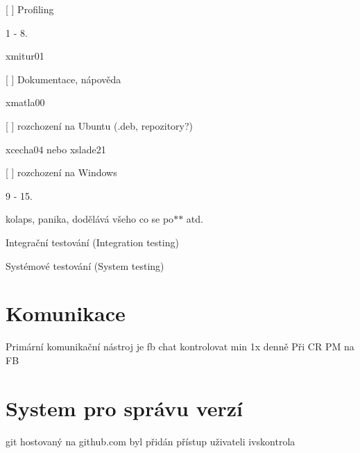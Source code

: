 \begin{DoxyItemize}
\begin{DoxyItemize}
\begin{DoxyItemize}
\item \mbox{[} \mbox{]} Profiling
\end{DoxyItemize}
\end{DoxyItemize}
\item 1 -\/ 8.
\begin{DoxyItemize}
\item xmitur01
\begin{DoxyItemize}
\item \mbox{[} \mbox{]} Dokumentace, nápověda
\end{DoxyItemize}
\item xmatla00
\begin{DoxyItemize}
\item \mbox{[} \mbox{]} rozchození na Ubuntu (.deb, repozitory?)
\end{DoxyItemize}
\item xcecha04 nebo xslade21
\begin{DoxyItemize}
\item \mbox{[} \mbox{]} rozchození na Windows
\end{DoxyItemize}
\end{DoxyItemize}
\item 9 -\/ 15.
\begin{DoxyItemize}
\item kolaps, panika, dodělává všeho co se po$\ast$$\ast$ atd.
\item Integrační testování (Integration testing)
\item Systémové testování (System testing)
\end{DoxyItemize}
\end{DoxyItemize}

\section*{Komunikace}

Primární komunikační nástroj je fb chat kontrolovat min 1x denně Při CR PM na FB

\section*{System pro správu verzí}

git hostovaný na github.\+com byl přidán přístup uživateli ivskontrola 